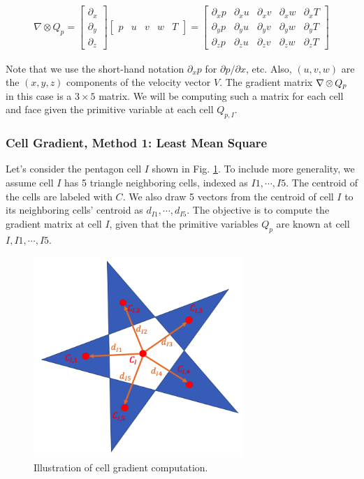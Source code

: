 \documentclass[12pt, letterpaper]{report}
\begin{document}
\begin{align*}
   \nabla \mathop{\otimes} Q_p = \begin{bmatrix} \partial_x \\ \partial_y \\ \partial_z \end{bmatrix}
   \begin{bmatrix}p & u & v & w & T\end{bmatrix} = 
   \begin{bmatrix}
      \partial_x p &\partial_x u &\partial_x v &\partial_x w &\partial_x T \\
      \partial_y p &\partial_y u &\partial_y v &\partial_y w &\partial_y T \\
      \partial_z p &\partial_z u &\partial_z v &\partial_z w &\partial_z T 
   \end{bmatrix}
\end{align*}

Note that we use the short-hand notation $\partial_x p$ for $\partial p/\partial x$, etc. Also, $(u,
v, w)$ are the $(x,y,z)$ components of the velocity vector $V$. The gradient matrix $\nabla \mathop{\otimes} Q_p$
in this case is a $3 \times 5$ matrix. We will be computing such a matrix for each cell and face
given the primitive variable at each cell $Q_{p,I}$.

\subsubsection{Cell Gradient, Method 1: Least Mean Square}

Let's consider the pentagon cell $I$ shown in Fig. \ref{fig-cellg}. To include more generality, we
assume cell $I$ has 5 triangle neighboring cells, indexed as $I1, \cdots, I5$. The centroid of
the cells are labeled with $C$. We also draw 5 vectors from the centroid of cell $I$ to its
neighboring cells' centroid as $d_{I1}, \cdots, d_{I5}$. The objective is to compute the gradient
matrix at cell $I$, given that the primitive variables $Q_p$ are known at cell $I, I1, \cdots,
I5$.

\begin{figure}[H]
   \centering
   \includegraphics[height=3in]{Algorithm1.png}
   \caption{Illustration of cell gradient computation.}
   \label{fig-cellg}
\end{figure}
\end{document}
